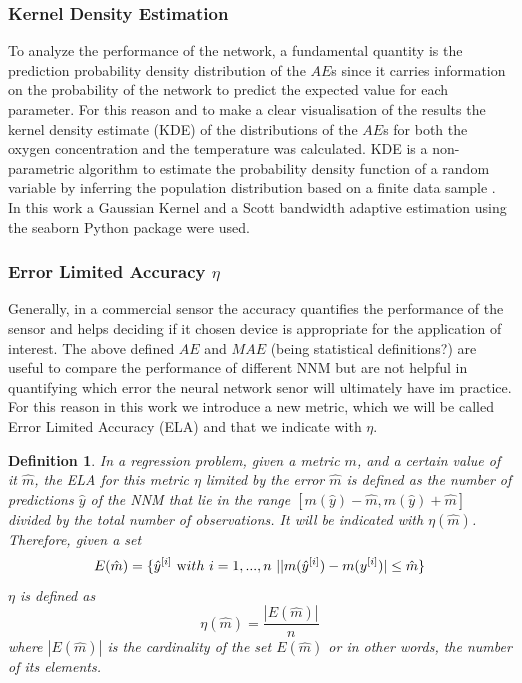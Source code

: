 \documentclass[9pt,twocolumn,twoside,pdftex]{optica}
\newtheorem*{definition*}{Definition}
\begin{document}
\subsubsection{Kernel Density Estimation}

To analyze the performance of the network, a fundamental quantity is the prediction probability density distribution of the $AE$s since it carries information on the probability of the network to predict the expected value for each parameter. For this reason and to make a clear visualisation of the results the  kernel density estimate (KDE) of the distributions of the $AE$s for both the oxygen concentration and the temperature was calculated. KDE is a non-parametric algorithm to estimate the probability density function of a random variable by inferring the population distribution based on a finite data sample \cite{Hastie2009}. 
In this work a Gaussian Kernel and a Scott bandwidth adaptive estimation \cite{Sain1996} using the seaborn Python package \cite{Waskom2020} were used.


\subsubsection{Error Limited Accuracy $\eta$}
\label{sektion:ela}

Generally, in a commercial sensor the accuracy quantifies the performance of the sensor and helps deciding if it chosen device is appropriate for the application of interest. The above defined $AE$ and $MAE$ (being statistical definitions?) are useful to compare the performance of different NNM but are not helpful in quantifying which error the neural network senor will ultimately have im practice.
For this reason in this work we introduce a new metric, which we will be called Error Limited Accuracy (ELA) and that we indicate with $\eta$.

\begin{definition*}
In a regression problem, given a metric $m$, and a certain value of it $\hat m$, the ELA for this metric $\eta$ limited by the error $\hat m$ is defined as the number of predictions $\hat y$ of the NNM that lie in the range $[m(\hat y)-\hat m, m(\hat y)+\hat m]$ divided by the total number of observations. It will be indicated with $\eta(\hat m)$. Therefore, given a set
\begin{equation}
E(\hat m) = \{ \hat y^{[i]} \ {\text with } \ i = 1,..., n\ | |m(\hat y^{[i]})-m(y^{[i]})|\leq \hat m \} 
\end{equation}
$\eta$ is defined as
\begin{equation}
\eta(\hat m) = \frac{|E(\hat m)|}{n}
\end{equation}
where $|E(\hat m)|$ is the cardinality of the set $E(\hat m)$ or in other words, the number of its elements.
\end{definition*}
\end{document}

